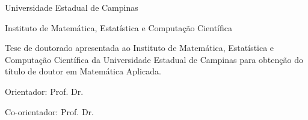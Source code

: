 \thispagestyle{plain}
\setcounter{page}{1}

\begin{center}
    {\Large {\sc Universidade Estadual de Campinas} }
\end{center}

\begin{center}
    {\Large {\sc Instituto de Matem\'atica, Estat\'istica e Computa\c c\~ao
    Cient\'ifica} }
\end{center}

\vspace{2cm}

\begin{center}
    {\huge {\sc \autor} }
\end{center}

\vspace{2cm}

\begin{center}
    {\huge {\sc \titulo} }
\end{center}

\vspace{1cm}

\begin{flushright}
    \begin{minipage}[c]{7.5cm}
        {\large
        Tese de doutorado %
        apresentada ao Instituto de Matem\'atica, Estat\'istica e
        Computa\c c\~ao Cient\'ifica da Universidade Estadual de Campinas para
        obten\c c\~ao do t\'itulo de
        doutor %
        em
        Matem\'atica Aplicada.
        }
    \end{minipage}
\end{flushright}

\vspace{1cm}

\begin{center}
    {\large {\sc
    Orientador: Prof. Dr. \orientador

    Co-orientador: Prof. Dr. \coorientador
    } }
\end{center}

\vspace{1cm}

